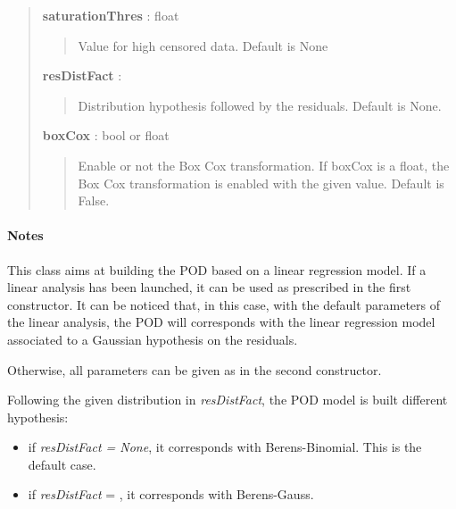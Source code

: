 \documentclass[letterpaper,10pt,english]{sphinxmanual}
\begin{document}
\begin{fulllineitems}
\begin{quote}
\begin{description}
\textbf{saturationThres} : float
\begin{quote}

Value for high censored data. Default is None
\end{quote}

\textbf{resDistFact} : \href{http://doc.openturns.org/openturns-latest/sphinx/user\_manual/\_generated/openturns.DistributionFactory.html\#openturns.DistributionFactory}{}
\begin{quote}

Distribution hypothesis followed by the residuals. Default is None.
\end{quote}

\textbf{boxCox} : bool or float
\begin{quote}

Enable or not the Box Cox transformation. If boxCox is a float, the Box
Cox transformation is enabled with the given value. Default is False.
\end{quote}

\end{description}\end{quote}
\paragraph{Notes}

This class aims at building the POD based on a linear regression
model. If a linear analysis has been launched, it can be used as prescribed 
in the first constructor. It can be noticed that, in this case, with the
default parameters of the linear analysis, the POD will corresponds with the
linear regression model associated to a Gaussian hypothesis on the residuals.

Otherwise, all parameters can be given as in the second constructor.

Following the given distribution in \emph{resDistFact}, the POD model is built
different hypothesis:
\begin{itemize}
\item {} 
if \emph{resDistFact = None}, it corresponds with Berens-Binomial. This
is the default case.

\item {} 
if \emph{resDistFact} = \href{http://doc.openturns.org/openturns-latest/sphinx/user\_manual/\_generated/openturns.NormalFactory.html\#openturns.NormalFactory}{}, it corresponds with Berens-Gauss.


\end{itemize}
\end{fulllineitems}
\end{document}
